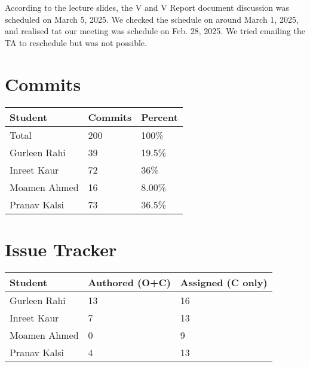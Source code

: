 \documentclass{article}
\begin{document}
According to the lecture slides, the V and V Report document discussion was scheduled on March 5, 2025. We checked the schedule on around March 1, 2025, and realised tat our meeting was schedule on Feb. 28, 2025. We tried emailing the TA to reschedule but was not possible. 

\section{Commits}


\begin{table}[H]
\centering
\begin{tabular}{lll}
\toprule
\textbf{Student} & \textbf{Commits} & \textbf{Percent}\\
\midrule
Total & 200 & 100\% \\
Gurleen Rahi & 39 & 19.5\% \\
Inreet Kaur & 72 & 36\% \\
Moamen Ahmed & 16 & 8.00\% \\
Pranav Kalsi & 73 & 36.5\% \\
\bottomrule
\end{tabular}
\end{table}


\section{Issue Tracker}


\begin{table}[H]
\centering
\begin{tabular}{lll}
\toprule
\textbf{Student} & \textbf{Authored (O+C)} & \textbf{Assigned (C only)}\\
\midrule
Gurleen Rahi & 13 & 16\\
Inreet Kaur & 7 & 13\\
Moamen Ahmed & 0 & 9\\
Pranav Kalsi & 4 & 13\\
\bottomrule
\end{tabular}
\end{table}


\end{document}
